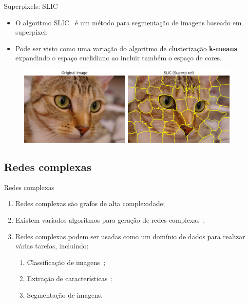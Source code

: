 \documentclass{templatebeamerufc/libs/ufc_format}
\begin{document}
\begin{frame}{Superpixels: SLIC}

  \begin{itemize}
  \item  O algoritmo SLIC~\cite{achanta2010slic} é um
    método para segmentação de imagens baseado em superpixel;
  \item Pode ser visto como uma variação do algoritmo de clusterização \textbf{k-means} expandindo
    o espaço euclidiano ao incluir também o espaço de cores.
  \end{itemize}
  \begin{figure}\label{fig:slic}
     \centering
        \includegraphics[scale=0.40]{figuras/slic2}
   \end{figure}
\end{frame}

\subsection{Redes complexas}

\begin{frame}{Redes complexas}
  \begin{enumerate}
    \item Redes complexas são grafos de alta complexidade;
    \item Existem variados algoritmos para geração de redes complexas~\cite{ComplexNetworksSurvey2007};
    \item Redes complexas podem ser usadas como um domínio de dados para realizar várias tarefas, incluindo:
    \begin{enumerate}
        \item Classificação de imagens~\cite{ComplexNetworksImageClassification2015};
        \item Extração de características~\cite{JarbasComplexNetworks2020};
        \item Segmentação de imagens.
    \end{enumerate}
\end{enumerate}
\end{frame}
\end{document}
